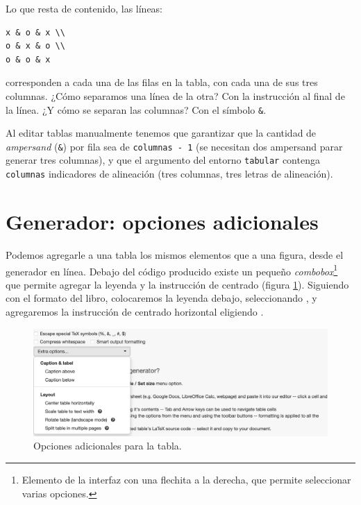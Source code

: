Lo que resta de contenido, las líneas:

\begin{lstlisting}[style=latex,numbers=none]
x & o & x \\
o & x & o \\
o & o & x
\end{lstlisting}

\noindent corresponden a cada una de las filas en la tabla, con cada una de sus tres columnas. ¿Cómo separamos una línea de la otra? Con la instrucción \codigo{\textbackslash{}} al final de la línea. ¿Y cómo se separan las columnas? Con el símbolo \texttt{\&}.

Al editar tablas manualmente tenemos que garantizar que la cantidad de \emph{ampersand} (\texttt{\&}) por fila sea de \texttt{columnas - 1} (se necesitan dos ampersand parar generar tres columnas), y que el argumento del entorno \texttt{tabular} contenga \texttt{columnas} indicadores de alineación (tres columnas, tres letras de alineación).



\section{Generador: opciones adicionales}
\label{sec:generador_opciones_adicionales}



Podemos agregarle a una tabla los mismos elementos que a una figura, desde el generador en línea. Debajo del código producido existe un pequeño \emph{combobox}\footnote{Elemento de la interfaz con una flechita a la derecha, que permite seleccionar varias opciones.} que permite agregar la leyenda y la instrucción de centrado (figura \ref{fig:table_editor_extra_options}). Siguiendo con el formato del libro, colocaremos la leyenda debajo, seleccionando , y agregaremos la instrucción de centrado horizontal eligiendo .

\begin{figure}[ht!]
	\centering
	\includegraphics[width=\linewidth]{img/table_editor_extra_options_300ppi.png}
	\caption{Opciones adicionales para la tabla.}
	\label{fig:table_editor_extra_options}
\end{figure}

